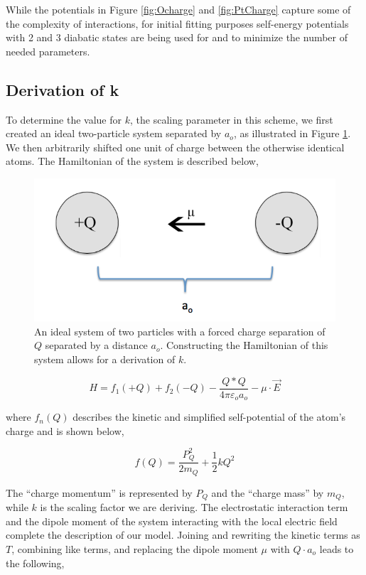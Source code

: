 While the potentials in Figure \ref{fig:Ocharge} and \ref{fig:PtCharge} capture
some of the complexity of  interactions, for initial fitting
purposes self-energy potentials with 2 and 3 diabatic states are being used for
 and  to minimize the number of needed parameters.

\subsection{Derivation of k}
To determine the value for $k$, the scaling parameter in this scheme, we first
created an ideal two-particle system separated by $a_o$, as illustrated in
Figure \ref{fig:kSketch}.  We then arbitrarily shifted one unit of charge
between the otherwise identical atoms. The Hamiltonian of the system is
described below,

\begin{figure}
  \centering
  \includegraphics[width=0.75\linewidth]{../figures/chap5/determineK2.png}
  \caption{An ideal system of two particles with a forced charge separation of
$Q$ separated by a distance $a_o$. Constructing the Hamiltonian of this system
allows for a derivation of $k$.}
\label{fig:kSketch}
\end{figure}

\begin{equation*}
H = f_1(+Q) + f_2(-Q) - \frac{Q*Q}{4\pi\varepsilon_o a_o} - \mu\cdot\vec{E}
\end{equation*}

where $f_n(Q)$ describes the kinetic and simplified self-potential of the
atom's charge and is shown below,

\begin{equation*}
f(Q) = \frac{P_Q^2}{2m_Q} + \frac{1}{2}kQ^2
\end{equation*}

The ``charge momentum'' is represented by $P_Q$ and the ``charge mass'' by $m_Q$, while
$k$ is the scaling factor we are deriving. The electrostatic interaction term
and the dipole moment of the system interacting with the local electric field
complete the description of our model. Joining and rewriting the kinetic terms as $T$,
combining like terms, and replacing the dipole moment $\mu$ with $Q\cdot a_o$ leads to the
following,

